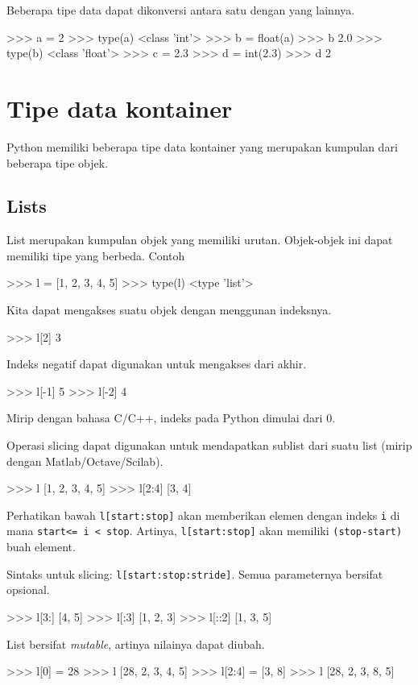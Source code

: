 \documentclass[a4paper,11pt]{extarticle}
\begin{document}
Beberapa tipe data dapat dikonversi antara satu dengan yang lainnya.
\begin{pyconcode}
>>> a = 2
>>> type(a)
<class 'int'>
>>> b = float(a)
>>> b
2.0
>>> type(b)
<class 'float'>
>>> c = 2.3
>>> d = int(2.3)
>>> d
2
\end{pyconcode}

\section{Tipe data kontainer}
Python memiliki beberapa tipe data kontainer yang merupakan kumpulan
dari beberapa tipe objek.

\subsection{Lists}
List merupakan kumpulan objek yang memiliki urutan. Objek-objek ini
dapat memiliki tipe yang berbeda. Contoh
\begin{pyconcode}
>>> l = [1, 2, 3, 4, 5]
>>> type(l)
<type 'list'>
\end{pyconcode}

Kita dapat mengakses suatu objek dengan menggunan indeksnya.
\begin{pyconcode}
>>> l[2]
3
\end{pyconcode}

Indeks negatif dapat digunakan untuk mengakses dari akhir.
\begin{pyconcode}
>>> l[-1]
5
>>> l[-2]
4
\end{pyconcode}

Mirip dengan bahasa C/C++, indeks pada Python dimulai dari 0.

Operasi slicing dapat digunakan untuk mendapatkan sublist dari
suatu list (mirip dengan Matlab/Octave/Scilab).
\begin{pyconcode}
>>> l
[1, 2, 3, 4, 5]
>>> l[2:4]
[3, 4]
\end{pyconcode}

Perhatikan bawah \texttt{l[start:stop]} akan memberikan
elemen dengan indeks \texttt{i} di mana \texttt{start<= i < stop}.
Artinya, \texttt{l[start:stop]} akan memiliki
\texttt{(stop-start)} buah element.

Sintaks untuk slicing: \texttt{l[start:stop:stride]}.
Semua parameternya bersifat opsional.
\begin{pyconcode}
>>> l[3:]
[4, 5]
>>> l[:3]
[1, 2, 3]
>>> l[::2]
[1, 3, 5]
\end{pyconcode}

List bersifat \textit{mutable}, artinya nilainya dapat diubah.
\begin{pyconcode}
>>> l[0] = 28
>>> l
[28, 2, 3, 4, 5]
>>> l[2:4] = [3, 8] 
>>> l
[28, 2, 3, 8, 5]
\end{pyconcode}
\end{document}
